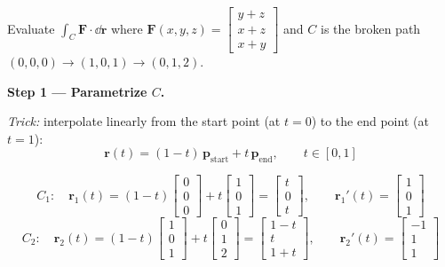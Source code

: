 \begin{example}
  Evaluate $\displaystyle\int_C \mathbf{F}\cdot \dd{\mathbf{r}}$ where
  $\mathbf{F}(x,y,z) =
    \begin{bmatrix}
      y+z \\ x+z \\ x+y
    \end{bmatrix}
  $ and $C$
  is the broken path $(0,0,0)\to(1,0,1)\to(0,1,2)$.

  \textbf{Step 1 — Parametrize $C$.}

  \emph{Trick:} interpolate linearly from the start
  point (at $t=0$) to the end point (at $t=1$):
  \[
    \mathbf{r}(t) = (1-t)\,\mathbf{p}_{\text{start}} + t\,\mathbf{p}_{\text{end}},
    \qquad t\in[0,1]
  \]

  \[
    C_1\colon\quad
    \mathbf{r}_1(t) = (1-t)
    \begin{bmatrix}
      0 \\0\\0
    \end{bmatrix}
    + t
    \begin{bmatrix}
      1 \\0\\1
    \end{bmatrix}
    =
    \begin{bmatrix}
      t \\0\\t
    \end{bmatrix}
    ,
    \qquad
    \mathbf{r}_1'(t) =
    \begin{bmatrix}
      1 \\0\\1
    \end{bmatrix}
  \]
  \[
    C_2\colon\quad
    \mathbf{r}_2(t) = (1-t)
    \begin{bmatrix}
      1 \\0\\1
    \end{bmatrix}
    + t
    \begin{bmatrix}
      0 \\1\\2
    \end{bmatrix}
    =
    \begin{bmatrix}
      1-t \\t\\1+t
    \end{bmatrix}
    ,
    \qquad
    \mathbf{r}_2'(t) =
    \begin{bmatrix}
      -1 \\1\\1
    \end{bmatrix}
  \]


\end{example}
